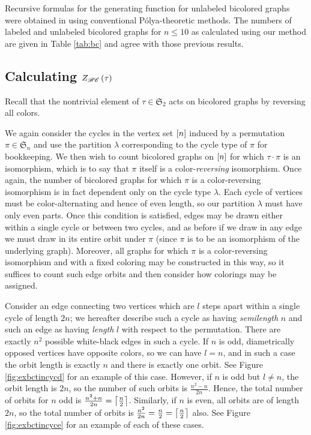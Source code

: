 \documentclass[sectionflow,singlespace,twoside]{brandiss} %
\numberwithin{section}{chapter}
\numberwithin{figure}{chapter}
\begin{document}
Recursive formulas for the generating function for unlabeled bicolored graphs were obtained in \cite{har:bicolored} using conventional P\'{o}lya-theoretic methods.
The numbers of labeled and unlabeled bicolored graphs for $n \leq 10$ as calculated using our method are given in Table \ref{tab:bc} and agree with those previous results.

\subsection{Calculating $Z_{\mathscr{BC}} \left( {\tau} \right)$}\label{ss:tcibc}
Recall that the nontrivial element of $\tau \in \mathfrak{S}_{2}$ acts on bicolored graphs by reversing all colors.

We again consider the cycles in the vertex set $\left[ {n} \right]$ induced by a permutation $\pi \in \mathfrak{S}_{n}$ and use the partition $\lambda$ corresponding to the cycle type of $\pi$ for bookkeeping.
We then wish to count bicolored graphs on $\left[ {n} \right]$ for which $\tau \cdot \pi$ is an isomorphism, which is to say that $\pi$ itself is a color-\emph{reversing} isomorphism.
Once again, the number of bicolored graphs for which $\pi$ is a color-reversing isomorphism is in fact dependent only on the cycle type $\lambda$.
Each cycle of vertices must be color-alternating and hence of even length, so our partition $\lambda$ must have only even parts.
Once this condition is satisfied, edges may be drawn either within a single cycle or between two cycles, and as before if we draw in any edge we must draw in its entire orbit under $\pi$ (since $\pi$ is to be an isomorphism of the underlying graph).
Moreover, all graphs for which $\pi$ is a color-reversing isomorphism and with a fixed coloring may be constructed in this way, so it suffices to count such edge orbits and then consider how colorings may be assigned.

Consider an edge connecting two vertices which are $l$ steps apart within a single cycle of length $2n$; we hereafter describe such a cycle as having \emph{semilength} $n$ and such an edge as having \emph{length} $l$ with respect to the permutation.
There are exactly $n^{2}$ possible white-black edges in such a cycle.
If $n$ is odd, diametrically opposed vertices have opposite colors, so we can have $l = n$, and in such a case the orbit length is exactly $n$ and there is exactly one orbit.
See Figure \ref{fig:exbctincycd} for an example of this case.
However, if $n$ is odd but $l \neq n$, the orbit length is $2n$, so the number of such orbits is $\frac{n^{2} - n}{2n}$.
Hence, the total number of orbits for $n$ odd is $\frac{n^2 + n}{2n} = \left\lceil {\frac{n}{2}} \right\rceil$.
Similarly, if $n$ is even, all orbits are of length $2n$, so the total number of orbits is $\frac{n^{2}}{2n} = \frac{n}{2} = \left\lceil {\frac{n}{2}} \right\rceil$ also.
See Figure \ref{fig:exbctincyce} for an example of each of these cases.
\end{document}
